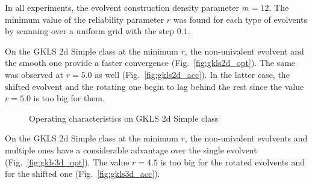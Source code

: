 \documentclass[runningheads]{llncs}
\begin{document}
In all experiments, the evolvent construction density parameter $m=12$. The minimum value of
the reliability parameter \(r\) was found for each type of evolvents by scanning over a uniform grid
with the step \(0.1\).

On the GKLS 2d Simple class at the minimum \(r\), the non-univalent evolvent and the smooth
one provide a faster convergence (Fig.~\ref{fig:gkls2d_opt}). The same was observed at
\(r=5.0\) as well (Fig.~\ref{fig:gkls2d_acc}). In the latter case, the shifted evolvent and the
rotating one begin to lag behind the rest since the value \(r=5.0\) is too big for them.
\begin{figure}[ht]
    \centering

    \caption{Operating characteristics on GKLS 2d Simple class}
\end{figure}

On the GKLS 2d Simple class at the minimum \(r\), the non-univalent evolvents and multiple
ones have a considerable advantage over the single evolvent (Fig.~\ref{fig:gkls3d_opt}).
The value \(r=4.5\) is too big for the rotated evolvents and for the shifted one
(Fig.~\ref{fig:gkls3d_acc}).
\end{document}
